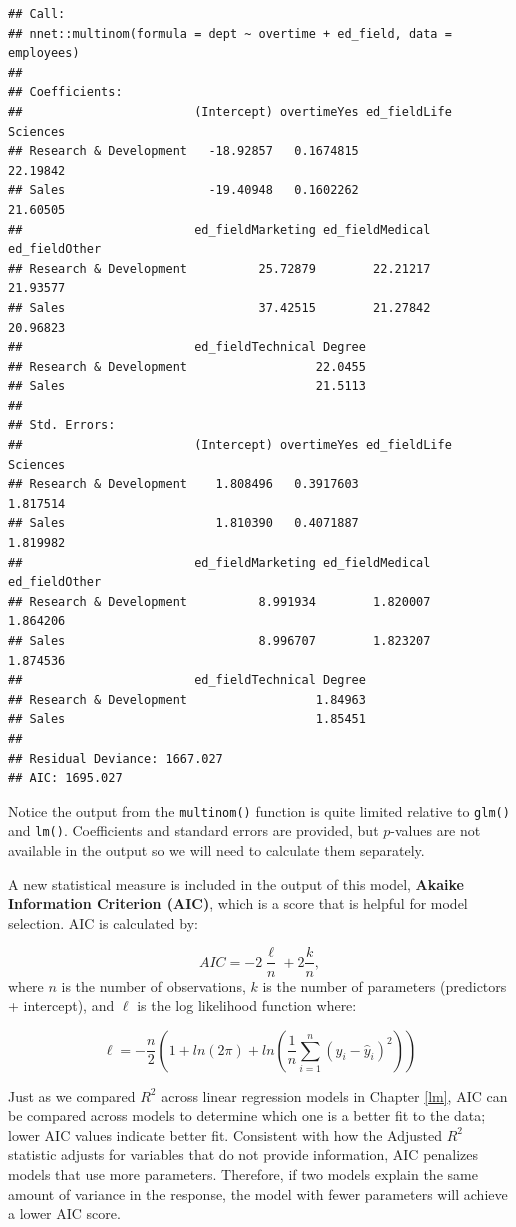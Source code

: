 \documentclass[
]{book}
\begin{document}
\begin{verbatim}
## Call:
## nnet::multinom(formula = dept ~ overtime + ed_field, data = employees)
## 
## Coefficients:
##                        (Intercept) overtimeYes ed_fieldLife Sciences
## Research & Development   -18.92857   0.1674815              22.19842
## Sales                    -19.40948   0.1602262              21.60505
##                        ed_fieldMarketing ed_fieldMedical ed_fieldOther
## Research & Development          25.72879        22.21217      21.93577
## Sales                           37.42515        21.27842      20.96823
##                        ed_fieldTechnical Degree
## Research & Development                  22.0455
## Sales                                   21.5113
## 
## Std. Errors:
##                        (Intercept) overtimeYes ed_fieldLife Sciences
## Research & Development    1.808496   0.3917603              1.817514
## Sales                     1.810390   0.4071887              1.819982
##                        ed_fieldMarketing ed_fieldMedical ed_fieldOther
## Research & Development          8.991934        1.820007      1.864206
## Sales                           8.996707        1.823207      1.874536
##                        ed_fieldTechnical Degree
## Research & Development                  1.84963
## Sales                                   1.85451
## 
## Residual Deviance: 1667.027 
## AIC: 1695.027
\end{verbatim}

Notice the output from the \texttt{multinom()} function is quite limited relative to \texttt{glm()} and \texttt{lm()}. Coefficients and standard errors are provided, but \(p\)-values are not available in the output so we will need to calculate them separately.

A new statistical measure is included in the output of this model, \textbf{Akaike Information Criterion (AIC)}, which is a score that is helpful for model selection. AIC is calculated by:

\[ AIC = -2\frac{\ell}{n} + 2\frac{k}{n}, \]
where \(n\) is the number of observations, \(k\) is the number of parameters (predictors + intercept), and \(\ell\) is the log likelihood function where:

\[ \ell = -\frac{n}{2}(1 + ln(2\pi) + ln(\frac{1}{n} \displaystyle\sum_{i=1}^{n}(y_i - \hat{y}_i)^2))  \]

Just as we compared \(R^2\) across linear regression models in Chapter \ref{lm}, AIC can be compared across models to determine which one is a better fit to the data; lower AIC values indicate better fit. Consistent with how the Adjusted \(R^2\) statistic adjusts for variables that do not provide information, AIC penalizes models that use more parameters. Therefore, if two models explain the same amount of variance in the response, the model with fewer parameters will achieve a lower AIC score.
\end{document}
